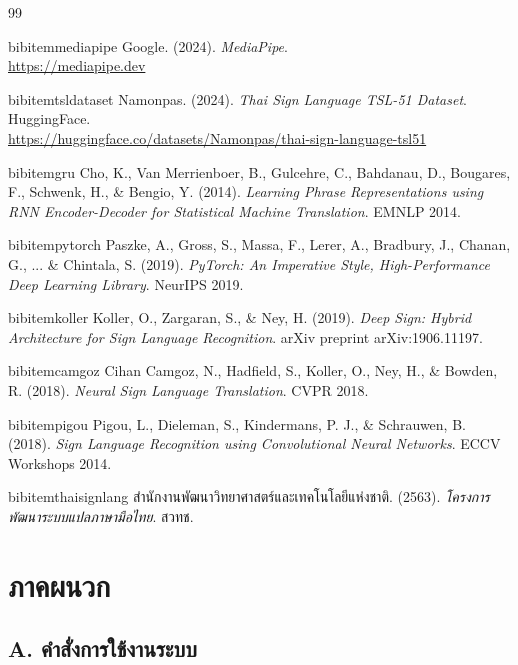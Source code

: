 \documentclass[12pt,a4paper]{report}
\begin{document}
\clearpage
{}
\begin{thebibliography}{99}

bibitem{mediapipe}
Google. (2024). \textit{MediaPipe}. 
\\\url{https://mediapipe.dev}

bibitem{tsldataset}
Namonpas. (2024). \textit{Thai Sign Language TSL-51 Dataset}. 
HuggingFace. 
\\\url{https://huggingface.co/datasets/Namonpas/thai-sign-language-tsl51}

bibitem{gru}
Cho, K., Van Merrienboer, B., Gulcehre, C., Bahdanau, D., Bougares, F., Schwenk, H., \& Bengio, Y. (2014). 
\textit{Learning Phrase Representations using RNN Encoder-Decoder for Statistical Machine Translation}. 
EMNLP 2014.

bibitem{pytorch}
Paszke, A., Gross, S., Massa, F., Lerer, A., Bradbury, J., Chanan, G., ... \& Chintala, S. (2019). 
\textit{PyTorch: An Imperative Style, High-Performance Deep Learning Library}. 
NeurIPS 2019.

bibitem{koller}
Koller, O., Zargaran, S., \& Ney, H. (2019). 
\textit{Deep Sign: Hybrid Architecture for Sign Language Recognition}. 
arXiv preprint arXiv:1906.11197.

bibitem{camgoz}
Cihan Camgoz, N., Hadfield, S., Koller, O., Ney, H., \& Bowden, R. (2018). 
\textit{Neural Sign Language Translation}. 
CVPR 2018.

bibitem{pigou}
Pigou, L., Dieleman, S., Kindermans, P. J., \& Schrauwen, B. (2018). 
\textit{Sign Language Recognition using Convolutional Neural Networks}. 
ECCV Workshops 2014.

bibitem{thaisignlang}
สำนักงานพัฒนาวิทยาศาสตร์และเทคโนโลยีแห่งชาติ. (2563). 
\textit{โครงการพัฒนาระบบแปลภาษามือไทย}. สวทช.

\end{thebibliography}

\clearpage
\appendix
\chapter{ภาคผนวก}

\section{A. คำสั่งการใช้งานระบบ}
\end{document}
